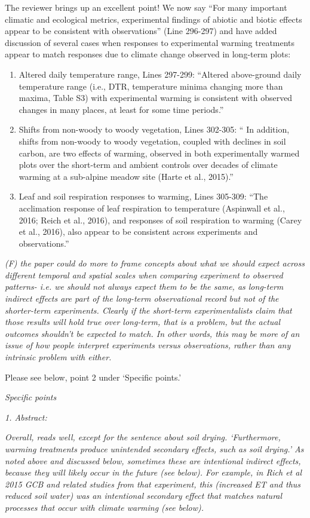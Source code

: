 \documentclass[11pt,a4paper]{letter}
\begin{document}
\begin{letter}{}
\par The reviewer brings up an excellent point! We now say ``For many important climatic and ecological metrics, experimental findings of abiotic and biotic effects
appear to be consistent with observations'' (Line 296-297) and have added discussion of several cases when responses to experimental warming treatments appear to match responses due to climate change observed in long-term plots:
\begin{enumerate}
\item Altered daily temperature range, Lines 297-299: ``Altered above-ground daily temperature range (i.e., DTR, temperature minima changing more than maxima, Table S3) with experimental warming is consistent with observed changes in many places, at least for some time periods.''
\item Shifts from non-woody to woody vegetation, Lines 302-305: `` In addition, shifts from non-woody to woody vegetation, coupled with declines in soil carbon, are two effects of warming, observed in both experimentally warmed plots over the short-term and ambient controls over decades of climate warming at a sub-alpine meadow site (Harte et al., 2015).''
\item Leaf and soil respiration responses to warming, Lines 305-309: ``The acclimation response of leaf respiration to temperature (Aspinwall et al., 2016; Reich et al., 2016), and
responses of soil respiration to warming (Carey et al., 2016), also appear to be consistent across experiments and observations.''
\end {enumerate}
\par \emph{(F) the paper could do more to frame concepts about what we should expect across different temporal and spatial scales when comparing experiment to observed patterns- i.e. we should not always expect them to be the same, as long-term indirect effects are part of the long-term observational record but not of the shorter-term experiments. Clearly if the short-term experimentalists claim that those results will hold true over long-term, that is a problem, but the actual outcomes shouldn't be expected to match. In other words, this may be more of an issue of how people interpret experiments versus observations, rather than any intrinsic problem with either.}

\par Please see below, point 2 under `Specific points.'

\emph{Specific points}
\\
\par \emph{1. Abstract:}
\par \emph{Overall, reads well, except for the sentence about soil drying. `Furthermore, warming treatments produce unintended secondary effects, such as soil drying.' As noted above and discussed below, sometimes these are intentional indirect effects, because they will likely occur in the future (see below). For example, in Rich et al 2015 GCB and related studies from that experiment, this (increased ET and thus reduced soil water) was an intentional secondary effect that matches natural processes that occur with climate warming (see below).}


\end{letter}
\end{document}
